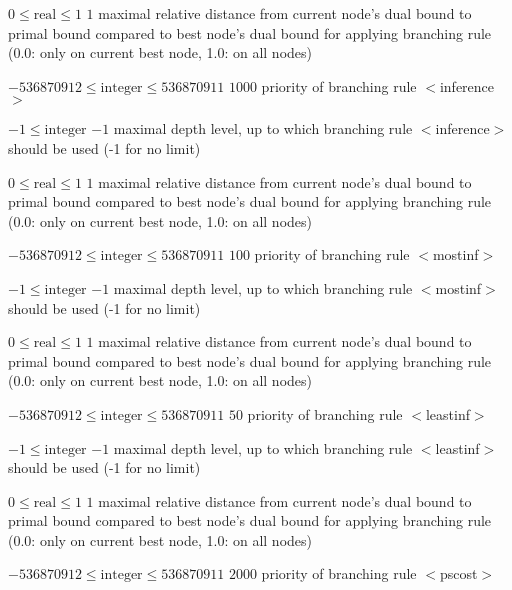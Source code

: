 %
{$0\leq\textrm{real}\leq1$}%
{$1$}%
{maximal relative distance from current node's dual bound to primal bound compared to best node's dual bound for applying branching rule (0.0: only on current best node, 1.0: on all nodes)}%
{}

%
{$-536870912\leq\textrm{integer}\leq536870911$}%
{$1000$}%
{priority of branching rule $<$inference$>$}%
{}

%
{$-1\leq\textrm{integer}$}%
{$-1$}%
{maximal depth level, up to which branching rule $<$inference$>$ should be used (-1 for no limit)}%
{}

%
{$0\leq\textrm{real}\leq1$}%
{$1$}%
{maximal relative distance from current node's dual bound to primal bound compared to best node's dual bound for applying branching rule (0.0: only on current best node, 1.0: on all nodes)}%
{}

%
{$-536870912\leq\textrm{integer}\leq536870911$}%
{$100$}%
{priority of branching rule $<$mostinf$>$}%
{}

%
{$-1\leq\textrm{integer}$}%
{$-1$}%
{maximal depth level, up to which branching rule $<$mostinf$>$ should be used (-1 for no limit)}%
{}

%
{$0\leq\textrm{real}\leq1$}%
{$1$}%
{maximal relative distance from current node's dual bound to primal bound compared to best node's dual bound for applying branching rule (0.0: only on current best node, 1.0: on all nodes)}%
{}

%
{$-536870912\leq\textrm{integer}\leq536870911$}%
{$50$}%
{priority of branching rule $<$leastinf$>$}%
{}

%
{$-1\leq\textrm{integer}$}%
{$-1$}%
{maximal depth level, up to which branching rule $<$leastinf$>$ should be used (-1 for no limit)}%
{}

%
{$0\leq\textrm{real}\leq1$}%
{$1$}%
{maximal relative distance from current node's dual bound to primal bound compared to best node's dual bound for applying branching rule (0.0: only on current best node, 1.0: on all nodes)}%
{}

%
{$-536870912\leq\textrm{integer}\leq536870911$}%
{$2000$}%
{priority of branching rule $<$pscost$>$}%
{}

